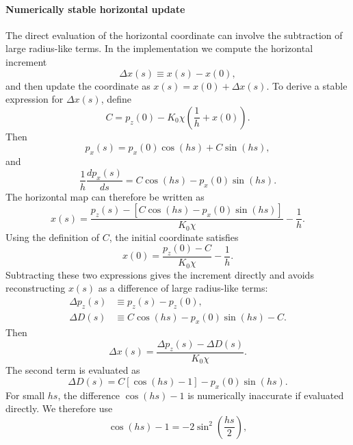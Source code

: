 \paragraph{Numerically stable horizontal update}

The direct evaluation of the horizontal coordinate can involve the subtraction
of large radius-like terms. In the implementation we compute the horizontal
increment
\begin{equation}
\Delta x(s) \equiv x(s)-x(0),
\end{equation}
and then update the coordinate as \(x(s)=x(0)+\Delta x(s)\). To derive a
stable expression for \(\Delta x(s)\), define
\begin{equation}
C = p_z(0)-K_0\chi\left(\frac{1}{h}+x(0)\right).
\end{equation}
Then
\begin{equation}
p_x(s)=p_x(0)\cos(hs)+C\sin(hs),
\end{equation}
and
\begin{equation}
\frac{1}{h}\frac{dp_x(s)}{ds}
=
C\cos(hs)-p_x(0)\sin(hs).
\end{equation}
The horizontal map can therefore be written as
\begin{equation}
x(s)=
\frac{p_z(s)-\left[C\cos(hs)-p_x(0)\sin(hs)\right]}{K_0\chi}
-\frac{1}{h}.
\end{equation}
Using the definition of \(C\), the initial coordinate satisfies
\begin{equation}
x(0)=
\frac{p_z(0)-C}{K_0\chi}
-\frac{1}{h}.
\end{equation}
Subtracting these two expressions gives the increment directly and avoids
reconstructing \(x(s)\) as a difference of large radius-like terms:
\begin{align}
\Delta p_z(s) &\equiv p_z(s)-p_z(0), \\
\Delta D(s) &\equiv C\cos(hs)-p_x(0)\sin(hs)-C.
\end{align}
Then
\begin{equation}
\Delta x(s)
=
\frac{\Delta p_z(s)-\Delta D(s)}{K_0\chi}.
\end{equation}
The second term is evaluated as
\begin{equation}
\Delta D(s)
=
C\left[\cos(hs)-1\right]-p_x(0)\sin(hs).
\end{equation}
For small \(hs\), the difference \(\cos(hs)-1\) is numerically inaccurate if
evaluated directly. We therefore use
\begin{equation}
\cos(hs)-1
=
-2\sin^2\left(\frac{hs}{2}\right),
\end{equation}

